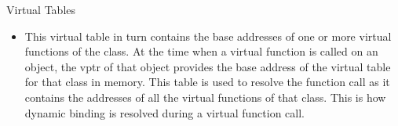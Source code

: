 \begin{frame}{Virtual Tables} 
    \begin{itemize}
        \item This virtual table in turn contains the base addresses of one or more virtual functions of the class. At the time when a virtual function is 
            called on an object, the vptr of that object provides the base address of the virtual table for that class in memory. This table is used to resolve 
            the function call as it contains the addresses of all the virtual functions of that class. This is how dynamic binding is resolved during a virtual 
            function call.
    \end{itemize}
\end{frame}

